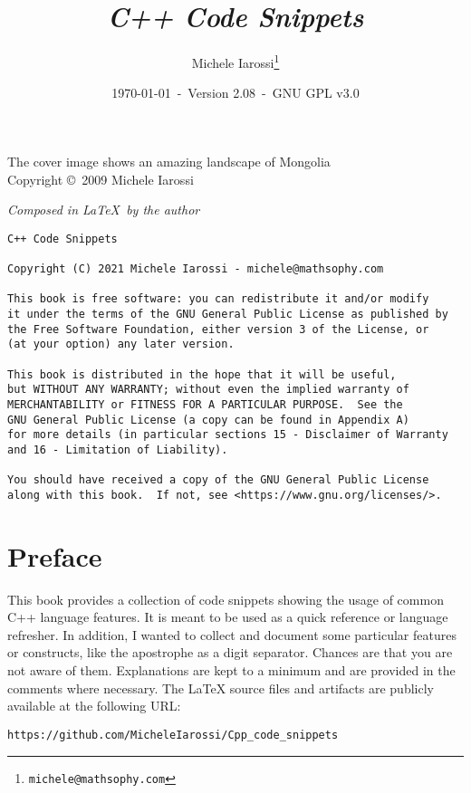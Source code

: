 \documentclass[10pt]{book}
\begin{document}
\mbox{} \thispagestyle{empty} \newpage
\mbox{} \thispagestyle{empty} \newpage
{}

\title{\emph{\textbf{C++ Code Snippets}}}
\author{Michele Iarossi\thanks{\texttt{michele@mathsophy.com}}}
\date{\small \today~-~Version 2.08~-~GNU GPL v3.0}


\maketitle

\newpage \mbox{}

\noindent
{\scriptsize The cover image shows an amazing landscape of Mongolia\\ Copyright \copyright~2009 Michele Iarossi}

\vspace*{\fill}
\noindent
\emph{Composed in \LaTeX~by the author}
\vspace*{\fill}
{\footnotesize
\begin{verbatim}
C++ Code Snippets

Copyright (C) 2021 Michele Iarossi - michele@mathsophy.com

This book is free software: you can redistribute it and/or modify
it under the terms of the GNU General Public License as published by
the Free Software Foundation, either version 3 of the License, or
(at your option) any later version.

This book is distributed in the hope that it will be useful,
but WITHOUT ANY WARRANTY; without even the implied warranty of
MERCHANTABILITY or FITNESS FOR A PARTICULAR PURPOSE.  See the
GNU General Public License (a copy can be found in Appendix A)
for more details (in particular sections 15 - Disclaimer of Warranty
and 16 - Limitation of Liability).

You should have received a copy of the GNU General Public License
along with this book.  If not, see <https://www.gnu.org/licenses/>.
\end{verbatim}
}

\newpage

\tableofcontents

\newpage
%
%
\chapter*{Preface}
\noindent
This book provides a collection of code snippets showing the usage of common C++ language features.
It is meant to be used as a quick reference or language refresher.
In addition, I wanted to collect and document some  particular features or constructs, like the apostrophe as a digit separator.
Chances are that you are not aware of them. Explanations are kept to a minimum and are provided in the comments where necessary. 
The \LaTeX{} source files and artifacts are publicly available at the following URL:
\begin{center}
\texttt{https://github.com/MicheleIarossi/Cpp\_code\_snippets}
\end{center}
%
%
\end{document}
